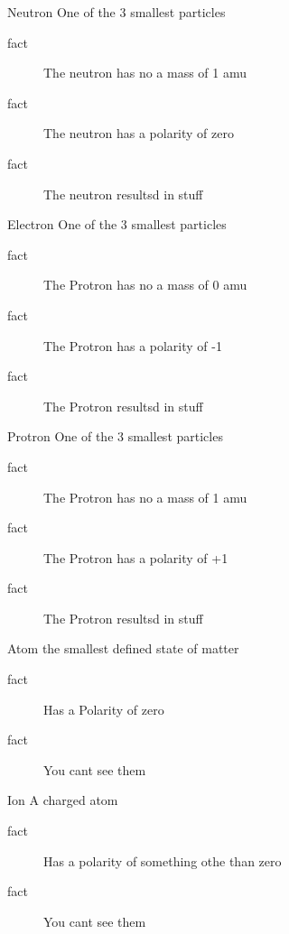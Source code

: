 \documentclass[avery5388,grid,frame]{flashcards}
\begin{document}

\begin{flashcard}[Definition]{Neutron}
One of the 3 smallest particles
  \smallskip
  \begin{description}
    \item[fact] The neutron has no a mass of 1 amu
    \item[fact] The neutron has a polarity of zero 
    \item[fact] The neutron resultsd in stuff 
  \end{description}
\end{flashcard}

\begin{flashcard}[Definition]{Electron}
One of the 3 smallest particles
  \smallskip
  \begin{description}
    \item[fact] The Protron has no a mass of 0 amu
    \item[fact] The Protron has a polarity of -1 
    \item[fact] The Protron resultsd in stuff 
  \end{description}
\end{flashcard}

\begin{flashcard}[Definition]{Protron}
One of the 3 smallest particles
  \smallskip
  \begin{description}
    \item[fact] The Protron has no a mass of 1 amu
    \item[fact] The Protron has a polarity of +1 
    \item[fact] The Protron resultsd in stuff 
  \end{description}
\end{flashcard}

\begin{flashcard}[Definition]{Atom}
  the smallest defined state of matter
  \smallskip
  \begin{description}
    \item[fact] Has a Polarity of zero
    \item[fact] You cant see them
  \end{description}
\end{flashcard}

\begin{flashcard}[Definition]{Ion}
  A charged atom
  \smallskip
  \begin{description}
    \item[fact] Has a polarity of something othe than zero
    \item[fact] You cant see them
  \end{description}
\end{flashcard}
\end{document}
